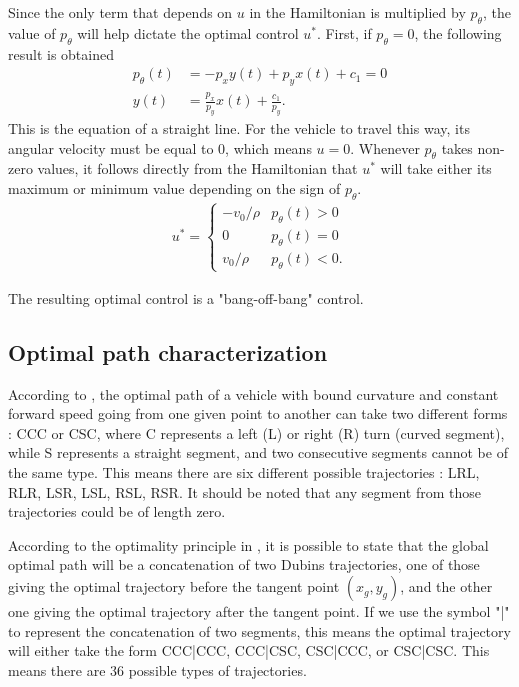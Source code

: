 \documentclass[12pt]{article}
\begin{document}
Since the only term that depends on $u$ in the Hamiltonian is multiplied by $p_\theta$, the value of $p_\theta$ will help dictate the optimal control $u^*$. First, if $p_\theta=0$, the following result is obtained
\begin{align}
    p_\theta(t) &= -p_x y(t) + p_yx(t) + c_1 = 0\\
    y(t) &= \frac{p_x}{p_y}x(t) + \frac{c_1}{p_y}.
\end{align}
This is the equation of a straight line. For the vehicle to travel this way, its angular velocity must be equal to 0, which means $u=0$. Whenever $p_\theta$ takes non-zero values, it follows directly from the Hamiltonian that $u^*$ will take either its maximum or minimum value depending on the sign of $p_\theta$.
\begin{align}
    u^* = \begin{cases}
        -v_0/\rho & p_\theta(t) > 0\\
        0 & p_\theta(t) = 0\\
        v_0/\rho & p_\theta(t) < 0.
    \end{cases}
\end{align}

The resulting optimal control is a "bang-off-bang" control.



\subsection{Optimal path characterization}

According to \cite{Dubins57}, the optimal path of a vehicle with bound curvature and constant forward speed going from one given point to another can take two different forms : CCC or CSC, where C represents a left (L) or right (R) turn (curved segment), while S represents a straight segment, and two consecutive segments cannot be of the same type. This means there are six different possible trajectories : LRL, RLR, LSR, LSL, RSL, RSR. It should be noted that any segment from those trajectories could be of length zero.

According to the optimality principle in \cite{Bellman1966}, it is possible to state that the global optimal path will be a concatenation of two Dubins trajectories, one of those giving the optimal trajectory before the tangent point $(x_g,y_g)$, and the other one giving the optimal trajectory after the tangent point. If we use the symbol "|" to represent the concatenation of two segments, this means the optimal trajectory will either take the form CCC|CCC, CCC|CSC, CSC|CCC, or CSC|CSC. This means there are 36 possible types of trajectories.
\end{document}
